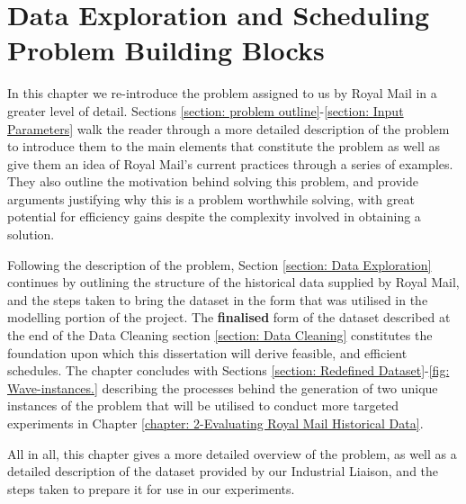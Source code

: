 \chapter{Data Exploration and Scheduling Problem Building Blocks}
\label{chapter: Problem Definition}


In this chapter we re-introduce the problem assigned to us by Royal Mail in a greater level of detail. Sections \ref{section: problem outline}-\ref{section: Input Parameters} walk the reader through a more detailed description of the problem to introduce them to the main elements that constitute the problem as well as give them an idea of Royal Mail's current practices through a series of examples. They also outline the motivation behind solving this problem, and provide arguments justifying why this is a problem worthwhile solving, with great potential for efficiency gains despite the complexity involved in obtaining a solution. 

\vspace{\baselineskip}
\noindent
Following the description of the problem, Section \ref{section: Data Exploration} continues by outlining the structure of the historical data supplied by Royal Mail, and the steps taken to bring the dataset in the form that was utilised in the modelling portion of the project. The \textbf{finalised} form of the dataset described at the end of the Data Cleaning section \ref{section: Data Cleaning} constitutes the foundation upon which this dissertation will derive feasible, and efficient schedules. The chapter concludes with Sections \ref{section: Redefined Dataset}-\ref{fig: Wave-instances.} describing the processes behind the generation of two unique instances of the problem that will be utilised to conduct more targeted experiments in Chapter \ref{chapter: 2-Evaluating Royal Mail Historical Data}. 

\vspace{\baselineskip}
\noindent
All in all, this chapter gives a more detailed overview of the problem, as well as a detailed description of the dataset provided by our Industrial Liaison, and the steps taken to prepare it for use in our experiments. 


